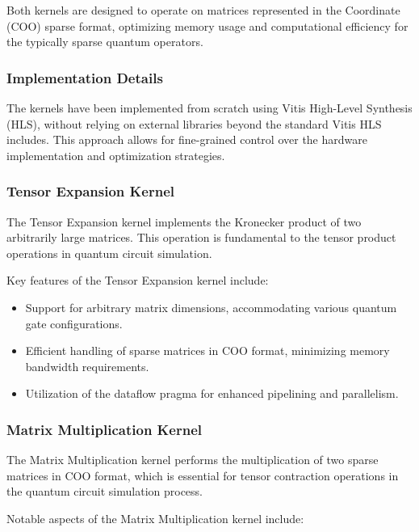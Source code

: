 \documentclass[12pt,oneside,a4paper]{article}
\begin{document}
Both kernels are designed to operate on matrices represented in the Coordinate (COO) sparse format, optimizing memory usage and computational efficiency for the typically sparse quantum operators.

\subsubsection{Implementation Details}

The kernels have been implemented from scratch using Vitis High-Level Synthesis (HLS), without relying on external libraries beyond the standard Vitis HLS includes. This approach allows for fine-grained control over the hardware implementation and optimization strategies.

\subsubsection{Tensor Expansion Kernel}

The Tensor Expansion kernel implements the Kronecker product of two arbitrarily large matrices. This operation is fundamental to the tensor product operations in quantum circuit simulation.

Key features of the Tensor Expansion kernel include:

\begin{itemize}
    \item Support for arbitrary matrix dimensions, accommodating various quantum gate configurations.
    \item Efficient handling of sparse matrices in COO format, minimizing memory bandwidth requirements.
    \item Utilization of the dataflow pragma for enhanced pipelining and parallelism.
\end{itemize}

\subsubsection{Matrix Multiplication Kernel}

The Matrix Multiplication kernel performs the multiplication of two sparse matrices in COO format, which is essential for tensor contraction operations in the quantum circuit simulation process.

Notable aspects of the Matrix Multiplication kernel include:
\end{document}
